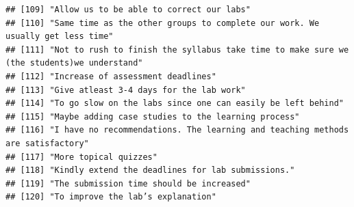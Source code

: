\documentclass[
]{article}
\begin{document}
\begin{verbatim}
## [109] "Allow us to be able to correct our labs"                                                                                                                                                                               
## [110] "Same time as the other groups to complete our work. We usually get less time"                                                                                                                                          
## [111] "Not to rush to finish the syllabus take time to make sure we (the students)we understand"                                                                                                                              
## [112] "Increase of assessment deadlines"                                                                                                                                                                                      
## [113] "Give atleast 3-4 days for the lab work"                                                                                                                                                                                
## [114] "To go slow on the labs since one can easily be left behind"                                                                                                                                                            
## [115] "Maybe adding case studies to the learning process"                                                                                                                                                                     
## [116] "I have no recommendations. The learning and teaching methods are satisfactory"                                                                                                                                         
## [117] "More topical quizzes"                                                                                                                                                                                                  
## [118] "Kindly extend the deadlines for lab submissions."                                                                                                                                                                      
## [119] "The submission time should be increased"                                                                                                                                                                               
## [120] "To improve the lab’s explanation"                                                                                                                                                                                      

\end{verbatim}
\end{document}
